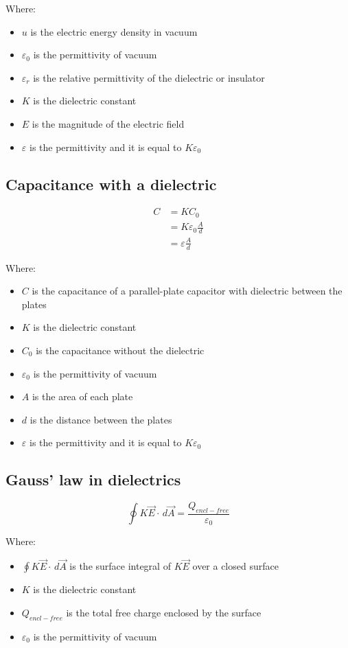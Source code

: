 \documentclass[11pt]{article}
\begin{document}
Where:
\begin{itemize}
\item \(u\) is the electric energy density in vacuum
\item \(\varepsilon_0\) is the permittivity of vacuum
\item \(\varepsilon_r\) is the relative permittivity of the dielectric or insulator
\item \(K\) is the dielectric constant
\item \(E\) is the magnitude of the electric field
\item \(\varepsilon\) is the permittivity and it is equal to \(K \varepsilon_0\)
\end{itemize}

\newpage

\subsection{Capacitance with a dielectric}
\label{sec:org567cbee}
\begin{align*}
C &= KC_0 \\
&= K \varepsilon_0 \frac{A}{d} \\
&= \varepsilon \frac{A}{d}
\end{align*}

Where:
\begin{itemize}
\item \(C\) is the capacitance of a parallel-plate capacitor with dielectric between the plates
\item \(K\) is the dielectric constant
\item \(C_0\) is the capacitance without the dielectric
\item \(\varepsilon_0\) is the permittivity of vacuum
\item \(A\) is the area of each plate
\item \(d\) is the distance between the plates
\item \(\varepsilon\) is the permittivity and it is equal to \(K \varepsilon_0\)
\end{itemize}

\subsection{Gauss' law in dielectrics}
\label{sec:org0aea28a}
\[\oint K \vec{E} \cdot \, d \vec{A} = \frac{Q_{encl-free}}{\varepsilon_0}\]

Where:
\begin{itemize}
\item \(\oint K \vec{E} \cdot \, d \vec{A}\) is the surface integral of \(K \vec{E}\) over a closed surface
\item \(K\) is the dielectric constant
\item \(Q_{encl-free}\) is the total free charge enclosed by the surface
\item \(\varepsilon_0\) is the permittivity of vacuum
\end{itemize}
\end{document}
